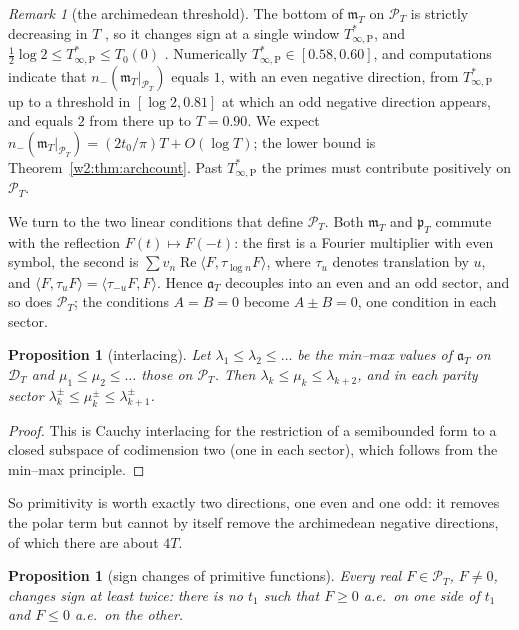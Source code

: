 \documentclass[11pt]{amsart}
\newtheorem{proposition}[theorem]{Proposition}
\theoremstyle{definition}
\theoremstyle{remark}
\newtheorem{remark}[theorem]{Remark}
\numberwithin{equation}{section}
\DeclareMathOperator{\Rel}{Re}
\newcommand{\PT}{\mathcal{P}_T}                        %
\newcommand{\DT}{\mathcal{D}_T}                        %
\newcommand{\mT}{\mathfrak{m}_T}                       %
\newcommand{\pT}{\mathfrak{p}_T}                       %
\newcommand{\aT}{\mathfrak{a}_T}                       %
\newcommand{\Tarch}{T^{*}_{\infty,\mathrm P}}          %
\begin{document}
\begin{remark}[the archimedean threshold]\label{w2:obs:arch}
The bottom of $\mT$ on $\PT$ is strictly decreasing in $T$ \cite[Lemma~7.5]{P46}, so it changes sign at a single window
$\Tarch$, and $\frac12\log2\le\Tarch\le T_0(0)$ \cite[Proposition~7.1]{P46}. Numerically $\Tarch\in[0.58,0.60]$, and
computations indicate that $n_-(\mT|_{\PT})$ equals $1$, with an even negative direction, from $\Tarch$ up to a
threshold in $[\log2,0.81]$ at which an odd negative direction appears, and equals $2$ from there up to $T=0.90$. We
expect $n_-(\mT|_{\PT})=(2t_0/\pi)T+O(\log T)$; the lower bound is Theorem~\ref{w2:thm:archcount}. Past $\Tarch$ the
primes must contribute positively on $\PT$.
\end{remark}

We turn to the two linear conditions that define $\PT$. Both $\mT$ and $\pT$ commute with the reflection
$F(t)\mapsto F(-t)$: the first is a Fourier multiplier with even symbol, the second is
$\sum v_n\Rel\langle F,\tau_{\log n}F\rangle$, where $\tau_u$ denotes translation by $u$, and
$\langle F,\tau_uF\rangle=\langle\tau_{-u}F,F\rangle$. Hence $\aT$ decouples into an even and an odd sector, and so does
$\PT$; the conditions $A=B=0$ become $A\pm B=0$, one condition in each sector.

\begin{proposition}[interlacing]\label{w2:prop:interlace}
Let $\lambda_1\le\lambda_2\le\dots$ be the min--max values of $\aT$ on $\DT$ and $\mu_1\le\mu_2\le\dots$ those on
$\PT$. Then $\lambda_k\le\mu_k\le\lambda_{k+2}$, and in each parity sector $\lambda^{\pm}_k\le\mu^{\pm}_k\le\lambda^\pm_{k+1}$.
\end{proposition}

\begin{proof}
This is Cauchy interlacing for the restriction of a semibounded form to a closed subspace of codimension two (one in each
sector), which follows from the min--max principle.
\end{proof}

So primitivity is worth exactly two directions, one even and one odd: it removes the polar term but cannot by itself
remove the archimedean negative directions, of which there are about $4T$.

\begin{proposition}[sign changes of primitive functions]\label{w2:prop:signchange}
Every real $F\in\PT$, $F\ne0$, changes sign at least twice: there is no $t_1$ such that $F\ge0$ a.e.\ on one side of
$t_1$ and $F\le0$ a.e.\ on the other.
\end{proposition}
\end{document}
